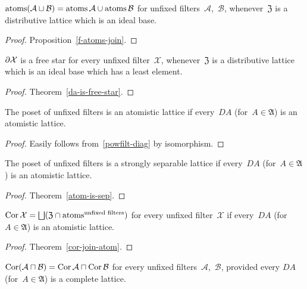 \begin{prop}
$\operatorname{atoms}(\mathcal{A}\sqcup\mathcal{B})=\operatorname{atoms}\mathcal{A}\cup\operatorname{atoms}\mathcal{B}$ for unfixed
filters~$\mathcal{A}$,~$\mathcal{B}$, whenever~$\mathfrak{Z}$
is a distributive lattice which is an ideal base.
\end{prop}

\begin{proof}
Proposition~\ref{f-atoms-join}.
\end{proof}

\begin{prop}
$\partial\mathcal{X}$ is a free star for every unfixed
filter~$\mathcal{X}$, whenever~$\mathfrak{Z}$
is a distributive lattice which is an ideal base which
has a least element.
\end{prop}

\begin{proof}
Theorem~\ref{da-is-free-star}.
\end{proof}

\begin{prop}
The poset of unfixed filters is an atomistic lattice if
every~$DA$ (for~$A\in\mathfrak{A}$) is an
atomistic lattice.
\end{prop}

\begin{proof}
Easily follows from~\ref{powfilt-diag} by isomorphism.
\end{proof}

\begin{prop}
The poset of unfixed filters is a strongly separable lattice
if every~$DA$ (for~$A\in\mathfrak{A}$) is an
atomistic lattice.
\end{prop}

\begin{proof}
Theorem~\ref{atom-is-sep}.
\end{proof}

\begin{prop}
$\Cor\mathcal{X}=\bigsqcup(\mathfrak{Z}\cap\atoms^{\text{unfixed filters}})$
for every unfixed filter~$\mathcal{X}$ if every~$DA$
(for~$A\in\mathfrak{A}$) is an atomistic lattice.
\end{prop}

\begin{proof}
Theorem~\ref{cor-join-atom}.
\end{proof}

\begin{prop}
$\operatorname{Cor}(\mathcal{A}\sqcap\mathcal{B})=
\operatorname{Cor}\mathcal{A}\sqcap\operatorname{Cor}\mathcal{B}$ for every unfixed
filters~$\mathcal{A}$,~$\mathcal{B}$, provided
every $DA$ (for~$A\in\mathfrak{A}$) is a complete lattice.
\end{prop}

